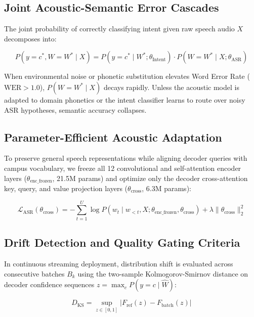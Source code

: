 \documentclass[sigconf,authordraft]{acmart}
\begin{document}
\subsection{Joint Acoustic-Semantic Error Cascades}

The joint probability of correctly classifying intent given raw speech audio $X$ decomposes into:

\begin{equation}
  P(y = c^*, W = W^* \mid X) = P(y = c^* \mid W^*; \theta_{\text{Intent}}) \cdot P(W = W^* \mid X; \theta_{\text{ASR}})
  \label{eq:joint}
\end{equation}

When environmental noise or phonetic substitution elevates Word Error Rate ($\text{WER} > 1.0$),
$P(W = W^* \mid X)$ decays rapidly. Unless the acoustic model is adapted to domain phonetics
or the intent classifier learns to route over noisy ASR hypotheses, semantic accuracy collapses.

\subsection{Parameter-Efficient Acoustic Adaptation}

To preserve general speech representations while aligning decoder queries with campus vocabulary,
we freeze all 12 convolutional and self-attention encoder layers ($\theta_{\text{enc\_frozen}}$, 21.5M params)
and optimize only the decoder cross-attention key, query, and value projection layers ($\theta_{\text{cross}}$, 6.3M params):

\begin{equation}
  \mathcal{L}_{\text{ASR}}(\theta_{\text{cross}}) = - \sum_{t=1}^U \log P(w_t \mid w_{<t}, X; \theta_{\text{enc\_frozen}}, \theta_{\text{cross}}) + \lambda \|\theta_{\text{cross}}\|_2^2
  \label{eq:adapt}
\end{equation}

\subsection{Drift Detection and Quality Gating Criteria}

In continuous streaming deployment, distribution shift is evaluated across consecutive batches
$B_k$ using the two-sample Kolmogorov-Smirnov distance on decoder confidence sequences $z = \max_c P(y=c \mid \hat{W})$:

\begin{equation}
  D_{\text{KS}} = \sup_{z \in [0, 1]} |F_{\text{ref}}(z) - F_{\text{batch}}(z)|
  \label{eq:ks}
\end{equation}
\end{document}
